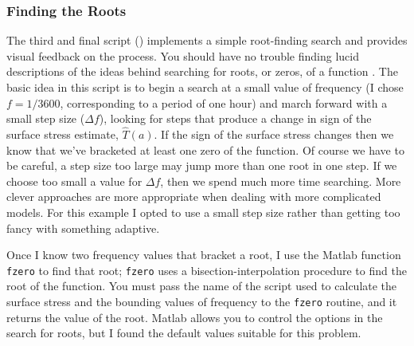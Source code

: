 \documentclass[11pt,titlepage,fleqn]{article}
\begin{document}
\subsubsection{Finding the Roots}

The third and final script () implements a simple root-finding search and provides visual feedback on the process. You should have no trouble finding lucid descriptions of the ideas behind searching for roots, or zeros, of a function \citep[\eg][]{Press1988}. The basic idea in this script is to begin a search at a small value of frequency (I chose $f = 1/3600$, corresponding to a period of one hour) and march forward with a small step size ($\Delta f$), looking for steps that produce a change in sign of the surface stress estimate, $\hat{T}(a)$. If the sign of the surface stress changes then we know that we’ve bracketed at least one zero of the function. Of course we have to be careful, a step size too large may jump more than one root in one step. If we choose too small a value for $\Delta f$, then we spend much more time searching. More clever approaches are more appropriate when dealing with more complicated models. For this example I opted to use a small step size rather than getting too fancy with something adaptive.

Once I know two frequency values that bracket a root, I use the Matlab function \verb+fzero+ to find that root; \verb+fzero+ uses a bisection-interpolation procedure to find the root of the function. You must pass the name of the script used to calculate the surface stress and the bounding values of frequency to the \verb+fzero+ routine, and it returns the value of the root. Matlab allows you to control the options in the search for roots, but I found the default values suitable for this problem.


\end{document}
